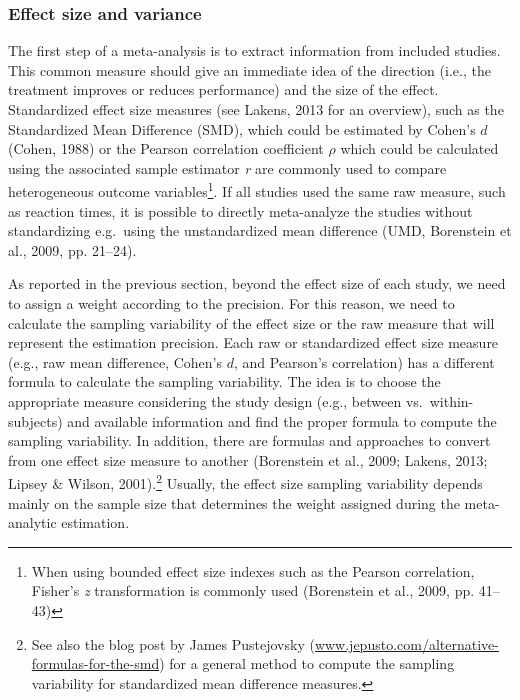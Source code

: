 \documentclass[
  man,floatsintext]{apa6}
\begin{document}
\hypertarget{effect-size-and-variance}{%
\subsubsection{Effect size and variance}\label{effect-size-and-variance}}

The first step of a meta-analysis is to extract information from included studies. This common measure should give an immediate idea of the direction (i.e., the treatment improves or reduces performance) and the size of the effect. Standardized effect size measures (see Lakens, 2013 for an overview), such as the Standardized Mean Difference (SMD), which could be estimated by Cohen's \(d\) (Cohen, 1988) or the Pearson correlation coefficient \(\rho\) which could be calculated using the associated sample estimator \emph{r} are commonly used to compare heterogeneous outcome variables\footnote{\color{red} When using bounded effect size indexes such as the Pearson correlation, Fisher's \emph{z} transformation is commonly used (Borenstein et al., 2009, pp. 41--43) \color{black}}. If all studies used the same raw measure, such as reaction times, it is possible to directly meta-analyze the studies without standardizing e.g.~using the unstandardized mean difference (UMD, Borenstein et al., 2009, pp. 21--24).

As reported in the previous section, beyond the effect size of each study, we need to assign a weight according to the precision. For this reason, we need to calculate the sampling variability of the effect size or the raw measure that will represent the estimation precision. Each raw or standardized effect size measure (e.g., raw mean difference, Cohen's \(d\), and Pearson's correlation) has a different formula to calculate the sampling variability. The idea is to choose the appropriate measure considering the study design (e.g., between vs.~within-subjects) and available information and find the proper formula to compute the sampling variability. In addition, there are formulas and approaches to convert from one effect size measure to another (Borenstein et al., 2009; Lakens, 2013; Lipsey \& Wilson, 2001).\footnote{See also the blog post by James Pustejovsky (\href{https://www.jepusto.com/alternative-formulas-for-the-smd/}{www.jepusto.com/alternative-formulas-for-the-smd}) for a general method to compute the sampling variability for standardized mean difference measures.} Usually, the effect size sampling variability depends mainly on the sample size that determines the weight assigned during the meta-analytic estimation.
\end{document}
